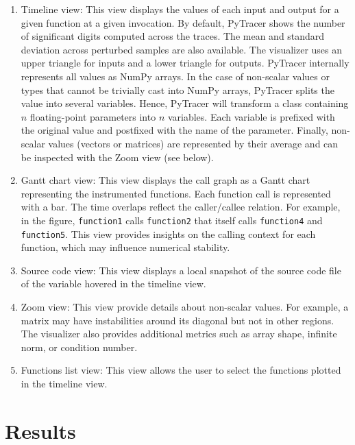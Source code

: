 \documentclass[10pt,journal,compsoc]{IEEEtran}
\newcommand{\pytracer}[0]{PyTracer\xspace}
\begin{document}
\begin{enumerate}
    \item Timeline view: This view displays the values of each input and output
          for a given function at a given invocation. By default, \pytracer
          shows the number of significant digits computed across the traces. The
          mean and standard deviation across perturbed samples are also
          available. The visualizer uses an upper triangle for inputs and a
          lower triangle for outputs. \pytracer internally represents all values
          as NumPy arrays. In the case of non-scalar values or types that cannot
          be trivially cast into NumPy arrays, \pytracer splits the value into
          several variables. Hence, \pytracer will transform a class containing
          $n$ floating-point parameters into $n$ variables. Each variable is
          prefixed with the original value and postfixed with the name of the
          parameter. Finally, non-scalar values (vectors or matrices) are
          represented by their average and can be inspected with the Zoom view
          (see below).
    \item Gantt chart view: This view displays the call graph as a Gantt chart
          representing the instrumented functions. Each function call is
          represented with a bar. The time overlaps reflect the caller/callee
          relation. For example, in the figure, \texttt{function1} calls
          \texttt{function2} that itself calls \texttt{function4} and
          \texttt{function5}. This view provides insights on the calling context
          for each function, which may influence numerical stability.
    \item  Source code view: This view displays a local snapshot of the source
          code file of the variable hovered in the timeline view.
    \item Zoom view: This view provide details about non-scalar values. For
          example, a matrix may have instabilities around its diagonal but not
          in other regions. The visualizer also provides additional metrics such
          as array shape, infinite norm, or condition number.
    \item  Functions list view: This view allows the user to select the
          functions plotted in the timeline view.
\end{enumerate}

\section{Results}
\end{document}
